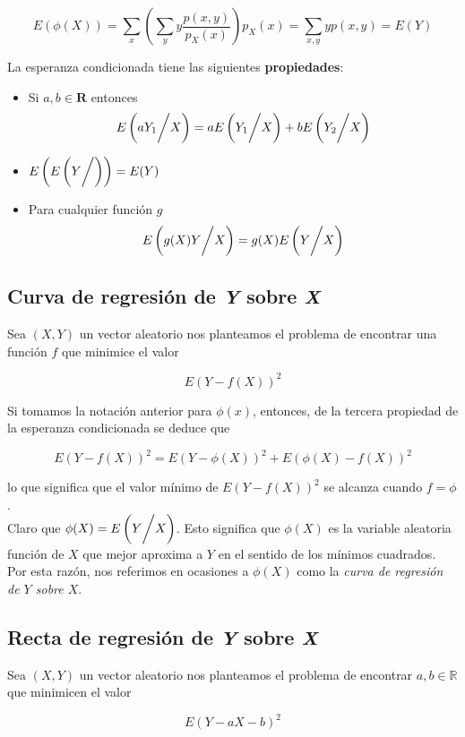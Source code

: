 \documentclass{article}
\begin{document}
\[ E(\phi(X)) = \sum_x \left( \sum_y y\frac{p(x,y)}{p_X(x)} \right) p_X(x) = \sum_{x,y}yp(x,y) = E(Y) \]

La esperanza condicionada tiene las siguientes \textbf{propiedades}:
\begin{itemize}
    \item Si $a,b \in \mathbf{R}$ entonces
        \[ E\left( aY_1 \bigg{/} X \right) = aE\left( Y_1 \bigg{/} X \right) + bE\left( Y_2 \bigg{/} X \right) \]
    \item $E\left( E\left( Y \bigg{/} \right) \right) = E(Y)$
    \item Para cualquier función $g$
        \[ E\left( g(X)Y \bigg{/} X \right) = g(X)E\left( Y \bigg{/} X \right) \]
\end{itemize}

\newpage

\subsection{Curva de regresión de \textit{Y} sobre \textit{X}}

Sea $(X,Y)$ un vector aleatorio nos planteamos el problema de encontrar una función $f$ que minimice el valor

\[ E(Y - f(X))^2 \]

Si tomamos la notación anterior para $\phi(x)$, entonces, de la tercera propiedad de la esperanza condicionada se deduce que

\[ E(Y -f(X))^2 = E(Y - \phi(X))^2 + E(\phi(X) - f(X))^2 \]

lo que significa que el valor mínimo de $E(Y - f(X))^2$ se alcanza cuando $f = \phi$. \\
Claro que $\phi(X) = E\left( Y \bigg{/} X \right)$. Esto significa que $\phi(X)$ es la variable aleatoria función de $X$ que
mejor aproxima a $Y$ en el sentido de los mínimos cuadrados. Por esta razón, nos referimos en ocasiones a $\phi(X)$ como la
\textit{curva de regresión de $Y$ sobre $X$}. \\

\subsection{Recta de regresión de \textit{Y} sobre \textit{X}}

Sea $(X,Y)$ un vector aleatorio nos planteamos el problema de encontrar $a,b \in \mathbb{R}$ que minimicen el valor

\[ E(Y - aX - b)^2 \]
\end{document}
